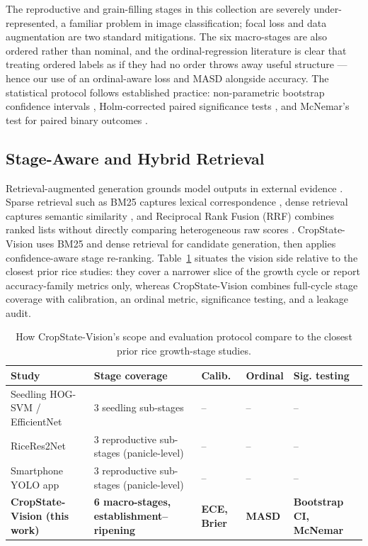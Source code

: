 \documentclass{llncs}
\begin{document}
The reproductive and grain-filling stages in this collection are severely under-represented, a familiar problem in image classification; focal loss \cite{lin2017focal} and data augmentation \cite{shorten2019survey} are two standard mitigations. The six macro-stages are also ordered rather than nominal, and the ordinal-regression literature is clear that treating ordered labels as if they had no order throws away useful structure \cite{gutierrez2016ordinal}---hence our use of an ordinal-aware loss and MASD alongside accuracy. The statistical protocol follows established practice: non-parametric bootstrap confidence intervals \cite{efron1993bootstrap}, Holm-corrected paired significance tests \cite{holm1979sequential}, and McNemar's test for paired binary outcomes \cite{mcnemar1947note}.

\subsection{Stage-Aware and Hybrid Retrieval}

Retrieval-augmented generation grounds model outputs in external evidence \cite{lewis2020rag}. Sparse retrieval such as BM25 captures lexical correspondence \cite{robertson2009bm25}, dense retrieval captures semantic similarity \cite{karpukhin2020dpr}, and Reciprocal Rank Fusion (RRF) combines ranked lists without directly comparing heterogeneous raw scores \cite{cormack2009rrf}. CropState-Vision uses BM25 and dense retrieval for candidate generation, then applies confidence-aware stage re-ranking. Table~\ref{tab:positioning} situates the vision side relative to the closest prior rice studies: they cover a narrower slice of the growth cycle or report accuracy-family metrics only, whereas CropState-Vision combines full-cycle stage coverage with calibration, an ordinal metric, significance testing, and a leakage audit.

\begin{table}[t]
\centering
\caption{How CropState-Vision's scope and evaluation protocol compare to the closest prior rice growth-stage studies.}
\label{tab:positioning}
\small
\begin{tabular}{p{}p{}>{\centering\arraybackslash}p{}>{\centering\arraybackslash}p{}p{}}
\toprule
\textbf{Study} & \textbf{Stage coverage} & \textbf{Calib.} & \textbf{Ordinal} & \textbf{Sig. testing} \\
\midrule
Seedling HOG-SVM / EfficientNet \cite{tan2022machine} & 3 seedling sub-stages & -- & -- & -- \\
RiceRes2Net \cite{tan2023ricepanicle} & 3 reproductive sub-stages (panicle-level) & -- & -- & -- \\
Smartphone YOLO app \cite{zheng2025android} & 3 reproductive sub-stages (panicle-level) & -- & -- & -- \\
\textbf{CropState-Vision (this work)} & \textbf{6 macro-stages, establishment--ripening} & \textbf{ECE, Brier} & \textbf{MASD} & \textbf{Bootstrap CI, McNemar} \\
\bottomrule
\end{tabular}
\end{table}
\end{document}
